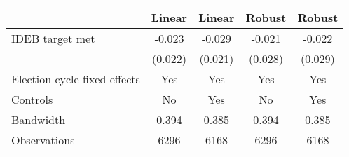\begin{tabular}{lcccc}
  \toprule
 & Linear & Linear & Robust & Robust \\ 
  \midrule
IDEB target met & -0.023 & -0.029 & -0.021 & -0.022 \\ 
   & (0.022) & (0.021) & (0.028) & (0.029) \\ 
  Election cycle fixed effects & Yes & Yes & Yes & Yes \\ 
  Controls & No & Yes & No & Yes \\ 
  Bandwidth & 0.394 & 0.385 & 0.394 & 0.385 \\ 
  Observations & 6296 & 6168 & 6296 & 6168 \\ 
   \bottomrule
\end{tabular}
